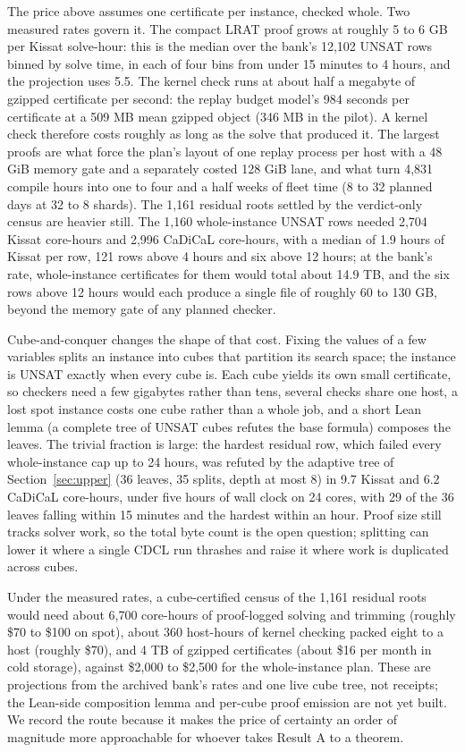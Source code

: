 \documentclass{anvil-paper}
\theoremstyle{definition}
\begin{document}
The price above assumes one certificate per instance, checked whole. Two measured rates govern it. The compact LRAT proof grows at roughly 5 to 6 GB per Kissat solve-hour: this is the median over the bank's 12,102 UNSAT rows binned by solve time, in each of four bins from under 15 minutes to 4 hours, and the projection uses 5.5. The kernel check runs at about half a megabyte of gzipped certificate per second: the replay budget model's 984 seconds per certificate at a 509 MB mean gzipped object (346 MB in the pilot). A kernel check therefore costs roughly as long as the solve that produced it. The largest proofs are what force the plan's layout of one replay process per host with a 48 GiB memory gate and a separately costed 128 GiB lane, and what turn 4,831 compile hours into one to four and a half weeks of fleet time (8 to 32 planned days at 32 to 8 shards). The 1,161 residual roots settled by the verdict-only census are heavier still. The 1,160 whole-instance UNSAT rows needed 2,704 Kissat core-hours and 2,996 CaDiCaL core-hours, with a median of 1.9 hours of Kissat per row, 121 rows above 4 hours and six above 12 hours; at the bank's rate, whole-instance certificates for them would total about 14.9 TB, and the six rows above 12 hours would each produce a single file of roughly 60 to 130 GB, beyond the memory gate of any planned checker.

Cube-and-conquer \citep{heule2011cube} changes the shape of that cost. Fixing the values of a few variables splits an instance into cubes that partition its search space; the instance is UNSAT exactly when every cube is. Each cube yields its own small certificate, so checkers need a few gigabytes rather than tens, several checks share one host, a lost spot instance costs one cube rather than a whole job, and a short Lean lemma (a complete tree of UNSAT cubes refutes the base formula) composes the leaves. The trivial fraction is large: the hardest residual row, which failed every whole-instance cap up to 24 hours, was refuted by the adaptive tree of Section~\ref{sec:upper} (36 leaves, 35 splits, depth at most 8) in 9.7 Kissat and 6.2 CaDiCaL core-hours, under five hours of wall clock on 24 cores, with 29 of the 36 leaves falling within 15 minutes and the hardest within an hour. Proof size still tracks solver work, so the total byte count is the open question; splitting can lower it where a single CDCL run thrashes and raise it where work is duplicated across cubes.

Under the measured rates, a cube-certified census of the 1,161 residual roots would need about 6,700 core-hours of proof-logged solving and trimming (roughly \$70 to \$100 on spot), about 360 host-hours of kernel checking packed eight to a host (roughly \$70), and 4 TB of gzipped certificates (about \$16 per month in cold storage), against \$2,000 to \$2,500 for the whole-instance plan. These are projections from the archived bank's rates and one live cube tree, not receipts; the Lean-side composition lemma and per-cube proof emission are not yet built. We record the route because it makes the price of certainty an order of magnitude more approachable for whoever takes Result A to a theorem.
\end{document}
